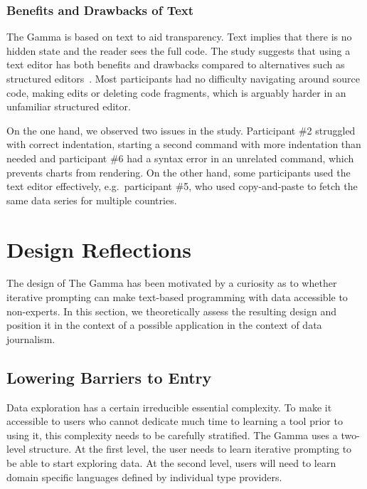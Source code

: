 \documentclass[manuscript,review,anonymous]{acmart}
\begin{document}
\subsubsection*{Benefits and Drawbacks of Text}
The Gamma is based on text to aid transparency. Text implies that there is no hidden state and
the reader sees the full code. The study suggests that using a text editor has both
benefits and drawbacks compared to alternatives such as structured editors~\cite{structure-based,livenut,lamdu}.
Most participants had no difficulty navigating around source code, making edits or deleting code
fragments, which is arguably harder in an unfamiliar structured editor.

On the one hand, we observed two issues in the study. Participant \#2 struggled with correct indentation, starting
a second command with more indentation than needed and participant \#6 had a syntax error in an unrelated command,
which prevents charts from rendering. On the other hand, some participants used the text editor effectively,
e.g.~participant \#5, who used copy-and-paste to fetch the same data series for multiple countries.




\section{Design Reflections}
\label{sec:design}

The design of The Gamma has been motivated by a curiosity as to whether iterative
prompting can make text-based programming with data accessible to non-experts. In this section,
we theoretically assess the resulting design and position it in the context of a possible application
in the context of data journalism.

\subsection{Lowering Barriers to Entry}
\label{sec:design-bar}

Data exploration has a certain irreducible essential complexity. To make it accessible to users who
cannot dedicate much time to learning a tool prior to using it, this complexity needs to be
carefully stratified. The Gamma uses a two-level structure. At the first level, the user needs
to learn iterative prompting to be able to start exploring data. At the second level, users will
need to learn domain specific languages defined by individual type providers.
\end{document}
